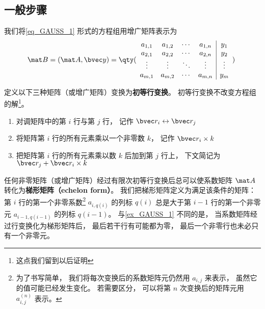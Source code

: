 \subsection{一般步骤}

我们将\autoref{eq_GAUSS_1} 形式的方程组用增广矩阵表示为
\begin{equation}
\mat B=(\mat A ,\bvec y)={
	\qty( \begin{array}{cccc|c}
	a_{1,1} &a_{1,2} &\cdots &a_{1,n} &y_1 \\
	a_{2,1} &a_{2,2} &\cdots &a_{2,n} &y_2 \\
	\vdots  &\vdots  &\ddots &\vdots  &\vdots \\
	a_{m,1} &a_{m,2} &\cdots &a_{m,n} &y_m \\
	\end{array} 
	)}~
\end{equation}

定义以下三种矩阵（或增广矩阵）变换为\textbf{初等行变换}。 初等行变换不改变方程组的解\footnote{这点我们留到以后证明}。%
\begin{enumerate}
\item 对调矩阵中的第 $i$ 行与第 $j$ 行， 记作 $\bvec r_i \leftrightarrow \bvec r_j$

\item 将矩阵第 $i$ 行的所有元素乘以一个非零数 $k$， 记作 $\bvec r_i \times k$

\item 把矩阵第 $i$ 行的所有元素乘以数 $k$ 后加到第 $j$ 行上， 下文简记为 $\bvec r_j + \bvec r_i \times k$
\end{enumerate}

任何非零矩阵（或增广矩阵）经过有限次初等行变换后总可以使系数矩阵 $\mat A$ 转化为\textbf{梯形矩阵（echelon form）}。 我们把梯形矩阵定义为满足该条件的矩阵： 第 $i$ 行的第一个非零系数\footnote{为了书写简单， 我们将每次变换后的系数矩阵元仍然用 $a_{i,j}$ 来表示， 虽然它的值可能已经发生变化。 若需要区分， 可以将第 $n$ 次变换后的矩阵元用 $a_{i,j}^{(n)}$ 表示。} $a_{i,q(i)}$ 的列标 $q(i)$ 总是大于第 $i-1$ 行的第一个非零元 $a_{i-1, q(i-1)}$ 的列标 $q(i-1)$。 与\autoref{ex_GAUSS_1} 不同的是， 当系数矩阵经过行变换化为梯形矩阵后， 最后若干行有可能都为零， 最后一个非零行也未必只有一个非零元。


